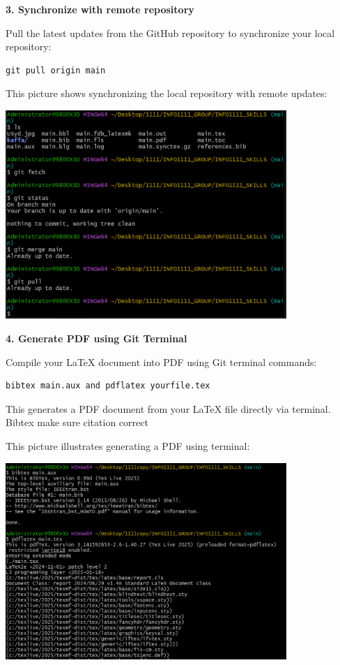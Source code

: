 \documentclass[a4paper, 11pt]{report}
\begin{document}
\textbf{3. Synchronize with remote repository}

Pull the latest updates from the GitHub repository to synchronize your local repository:

\begin{verbatim}
git pull origin main
\end{verbatim}

This picture shows synchronizing the local repository with remote updates:

\begin{center}
\includegraphics[width=0.8\textwidth]{kaffa/synchronize.png}
\end{center}


\textbf{4. Generate PDF using Git Terminal}

Compile your LaTeX document into PDF using Git terminal commands:

\begin{verbatim}
bibtex main.aux and pdflatex yourfile.tex
\end{verbatim}

This generates a PDF document from your LaTeX file directly via terminal. Bibtex make sure citation correct

This picture illustrates generating a PDF using terminal:

\begin{center}
\includegraphics[width=0.8\textwidth]{kaffa/forpdf.png}
\end{center}
\end{document}
